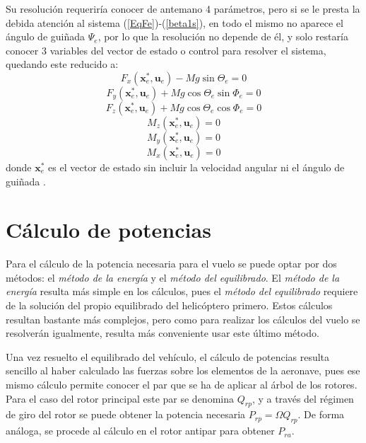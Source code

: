 Su resolución requeriría conocer de antemano 4 parámetros, pero si se le presta la debida atención al sistema (\ref{EqFe})-(\ref{beta1s}), en todo el mismo no aparece el ángulo de guiñada $\Psi_e$, por lo que la resolución no depende de él, y solo restaría conocer 3 variables del vector de estado o control para resolver el sistema, quedando este reducido a:
\begin{equation}
	F_x(\mathrm{\textbf{x}}_e^*,\mathrm{\textbf{u}}_e)-Mg\sin\Theta_e=0
\end{equation}
\begin{equation}
	F_y(\mathrm{\textbf{x}}_e^*,\mathrm{\textbf{u}}_e)+Mg\cos\Theta_e\sin\Phi_e=0
\end{equation}
\begin{equation}
	F_z(\mathrm{\textbf{x}}_e^*,\mathrm{\textbf{u}}_e)+Mg\cos\Theta_e\cos\Phi_e=0
\end{equation}
\begin{equation}
	M_z(\mathrm{\textbf{x}}_e^*,\mathrm{\textbf{u}}_e)=0
\end{equation}
\begin{equation}
	M_y(\mathrm{\textbf{x}}_e^*,\mathrm{\textbf{u}}_e)=0
\end{equation}
\begin{equation}
	M_x(\mathrm{\textbf{x}}_e^*,\mathrm{\textbf{u}}_e)=0
\end{equation}
donde $\mathrm{\textbf{x}}_e^*$ es el vector de estado sin incluir la velocidad angular ni el ángulo de guiñada \citep{Cuerva}.

\section{Cálculo de potencias}

Para el cálculo de la potencia necesaria para el vuelo se puede optar por dos métodos: el \emph{método de la energía} y el \emph{método del equilibrado}. El \emph{método de la energía} resulta más simple en los cálculos, pues el \emph{método del equilibrado} requiere de la solución del propio equilibrado del helicóptero primero. Estos cálculos resultan bastante más complejos, pero como para realizar los cálculos del vuelo se resolverán igualmente, resulta más conveniente usar este último método.

Una vez resuelto el equilibrado del vehículo, el cálculo de potencias resulta sencillo al haber calculado las fuerzas sobre los elementos de la aeronave, pues ese mismo cálculo permite conocer el par que se ha de aplicar al árbol de los rotores. Para el caso del rotor principal este par se denomina $Q_{rp}$, y a través del régimen de giro del rotor se puede obtener la potencia necesaria $P_{rp}=\Omega Q_{rp}$. De forma análoga, se procede al cálculo en el rotor antipar para obtener $P_{ra}$.

